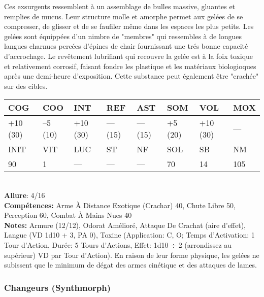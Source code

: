 Ces exsurgents ressemblent à un assemblage de bulles massive, gluantes et remplies de mucus. Leur structure molle et amorphe permet aux gelées de se compresser, de glisser et de se faufiler même dans les espaces les plus petits. Les gelées sont équippées d'un nimbre de "membres" qui ressembles à de longues langues charnues percées d'épines de chair fournissant une trés bonne capacité d'accrochage. Le revêtement lubrifiant qui recouvre la gelée est à la foix toxique et relativement corrosif, faisant fondre les plastique et les matériaux biologioques après une demi-heure d'exposition. Cette substance peut également être "crachée" sur des cibles.\\ \begin{tabular}{|l|l|l|l|l|l|l|l|} \hline

COG &COO &INT &REF &AST &SOM &VOL &MOX \\ \hline

+10 (30) &–5 (10) &+10 (30) &— (15) &— (15) &+5 (20) &+10 (30) &— \\ \hline

INIT &VIT &LUC &ST &NF &SOL &SB &NM \\ \hline

90 &1 &— &— &— &70 &14 &105 \\ \hline

\end{tabular} \\ \textbf{Allure}: 4/16 \\ \textbf{Compétences:} Arme À Distance Exotique (Crachar) 40, Chute Libre 50, Perception 60, Combat À Mains Nues 40 \\ \textbf{Notes:} Armure (12/12), Odorat Amélioré, Attaque De Crachat (aire d'effet), Langue (VD 1d10 + 3, PA 0), Toxine (Application: C, O; Temps d'Activation: 1 Tour d'Action, Durée: 5 Tours d'Actions, Effet: 1d10 $\div$ 2 (arrondissez au supérieur) VD par Tour d'Action). En raison de leur forme physique, les gelées ne subissent que le minimum de dégat des armes cinétique et des attaques de lames. 

\subsubsection{Changeurs (Synthmorph)} 


